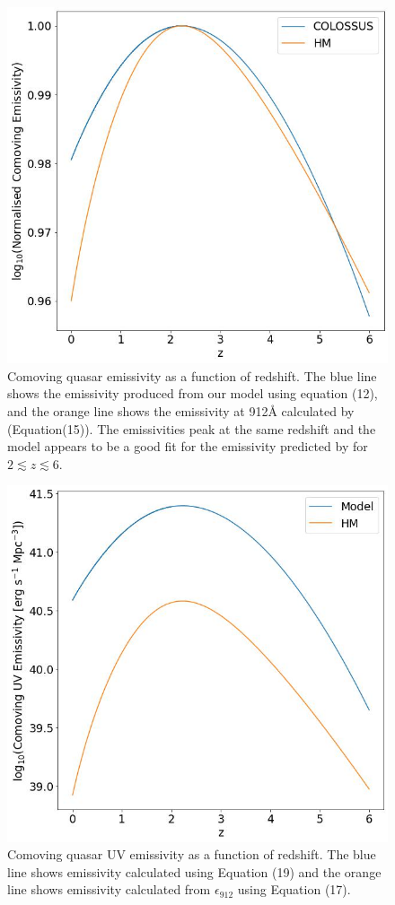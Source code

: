 \documentclass[12pt, twocolumn]{report}%
\begin{document}
\begin{figure}[H]
\centering
\includegraphics[width=12cm]{Plot_7b.jpeg}
\caption{Comoving quasar emissivity as a function of redshift. The blue line shows the emissivity produced from our model using equation (12), and the orange line shows the emissivity at 912\AA \: calculated by \cite{Haardt_Madau} (Equation(15)). The emissivities peak at the same redshift and the model appears to be a good fit for the emissivity predicted by \citeauthor{Haardt_Madau} for $2\lesssim z\lesssim6$.}
\label{fig:8}
\end{figure}

\begin{figure}[H]
\centering
\includegraphics[width=12cm]{Plot_8.jpeg}
\caption{Comoving quasar UV emissivity as a function of redshift. The blue line shows emissivity calculated using Equation (19) and the orange line shows emissivity calculated from $\epsilon_{912}$ using Equation (17).}
\label{fig:9}
\end{figure}
\end{document}
